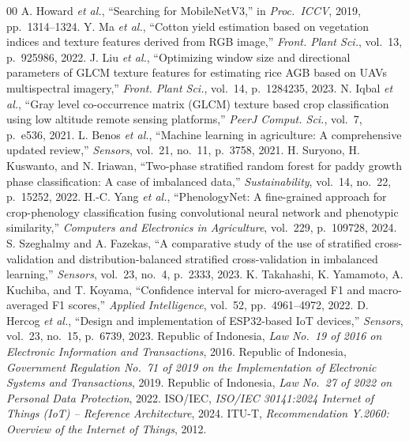 \documentclass[conference]{IEEEtran}
\begin{document}
\begin{thebibliography}{00}
 A. Howard \textit{et al.}, ``Searching for MobileNetV3,'' in \textit{Proc.\ ICCV}, 2019, pp.~1314--1324.
 Y. Ma \textit{et al.}, ``Cotton yield estimation based on vegetation indices and texture features derived from {RGB} image,'' \textit{Front. Plant Sci.}, vol.~13, p.~925986, 2022.
 J. Liu \textit{et al.}, ``Optimizing window size and directional parameters of {GLCM} texture features for estimating rice {AGB} based on {UAV}s multispectral imagery,'' \textit{Front. Plant Sci.}, vol.~14, p.~1284235, 2023.
 N. Iqbal \textit{et al.}, ``Gray level co-occurrence matrix ({GLCM}) texture based crop classification using low altitude remote sensing platforms,'' \textit{PeerJ Comput. Sci.}, vol.~7, p.~e536, 2021.
 L. Benos \textit{et al.}, ``Machine learning in agriculture: A comprehensive updated review,'' \textit{Sensors}, vol.~21, no.~11, p.~3758, 2021.
 H. Suryono, H. Kuswanto, and N. Iriawan, ``Two-phase stratified random forest for paddy growth phase classification: A case of imbalanced data,'' \textit{Sustainability}, vol.~14, no.~22, p.~15252, 2022.
 H.-C. Yang \textit{et al.}, ``{PhenologyNet}: A fine-grained approach for crop-phenology classification fusing convolutional neural network and phenotypic similarity,'' \textit{Computers and Electronics in Agriculture}, vol.~229, p.~109728, 2024.
 S. Szeghalmy and A. Fazekas, ``A comparative study of the use of stratified cross-validation and distribution-balanced stratified cross-validation in imbalanced learning,'' \textit{Sensors}, vol.~23, no.~4, p.~2333, 2023.
 K. Takahashi, K. Yamamoto, A. Kuchiba, and T. Koyama, ``Confidence interval for micro-averaged F1 and macro-averaged F1 scores,'' \textit{Applied Intelligence}, vol.~52, pp.~4961--4972, 2022.
 D. Hercog \textit{et al.}, ``Design and implementation of {ESP32}-based {IoT} devices,'' \textit{Sensors}, vol.~23, no.~15, p.~6739, 2023.
 Republic of Indonesia, \textit{Law No.~19 of 2016 on Electronic Information and Transactions}, 2016.
 Republic of Indonesia, \textit{Government Regulation No.~71 of 2019 on the Implementation of Electronic Systems and Transactions}, 2019.
 Republic of Indonesia, \textit{Law No.~27 of 2022 on Personal Data Protection}, 2022.
 ISO/IEC, \textit{ISO/IEC 30141:2024 Internet of Things (IoT) -- Reference Architecture}, 2024.
 ITU-T, \textit{Recommendation Y.2060: Overview of the Internet of Things}, 2012.
\end{thebibliography}
\end{document}
